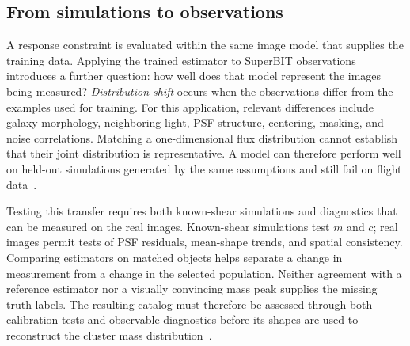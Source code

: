 \subsection{From simulations to observations}
\label{sec:transfer}


A response constraint is evaluated within the same image model that supplies the training data. Applying the trained estimator to SuperBIT observations introduces a further question: how well does that model represent the images being measured? \emph{Distribution shift} occurs when the observations differ from the examples used for training. For this application, relevant differences include galaxy morphology, neighboring light, PSF structure, centering, masking, and noise correlations. Matching a one-dimensional flux distribution cannot establish that their joint distribution is representative. A model can therefore perform well on held-out simulations generated by the same assumptions and still fail on flight data~\cite{mandelbaum_weak_2018,tewes_weak-lensing_2019}.

Testing this transfer requires both known-shear simulations and diagnostics that can be measured on the real images. Known-shear simulations test $m$ and $c$; real images permit tests of PSF residuals, mean-shape trends, and spatial consistency. Comparing estimators on matched objects helps separate a change in measurement from a change in the selected population. Neither agreement with a reference estimator nor a visually convincing mass peak supplies the missing truth labels. The resulting catalog must therefore be assessed through both calibration tests and observable diagnostics before its shapes are used to reconstruct the cluster mass distribution~\cite{saha_lensing_2026-1,mandelbaum_weak_2018}.
